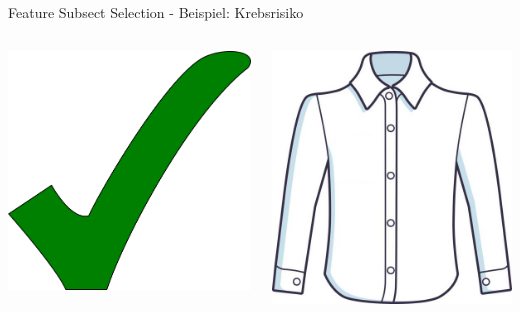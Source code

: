 \documentclass[xcolor=dvipsnames]{beamer}
\begin{document}
\begin{frame}{Feature Subsect Selection - Beispiel: Krebsrisiko}
\begin{columns}
\begin{column}{0.3\textwidth}
                     \includegraphics[width=(\textwidth / 3)]{img/tick_mark.png}
                     
            \end{column}
            \begin{column}{0.3\textwidth}
                    \center
                     \includegraphics[width=(\textwidth / 3)]{img/white_shirt.jpg}

\end{column}
\end{columns}
\end{frame}
\end{document}
